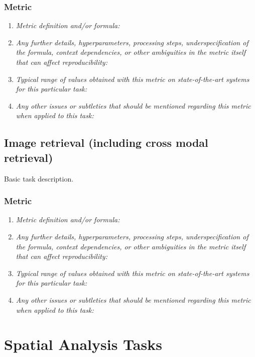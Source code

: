 \documentclass[a4paper,11pt]{article}
\begin{document}
    \subsubsection{Metric}
        \begin{enumerate}[label=\alph*.]
            \item \textit{Metric definition and/or formula:}
            \bigskip
            \item \textit{Any further details, hyperparameters, processing steps, underspecification of the formula, context dependencies, or other ambiguities in the metric itself that can affect reproducibility:}
            \bigskip
            \item \textit{Typical range of values obtained with this metric on state-of-the-art systems for this particular task:}
            \bigskip
            \item \textit{Any other issues or subtleties that should be mentioned regarding this metric when applied to this task:}
            \bigskip
        \end{enumerate}

\subsection{Image retrieval (including cross modal retrieval)}
    Basic task description.
    \subsubsection{Metric}
        \begin{enumerate}[label=\alph*.]
            \item \textit{Metric definition and/or formula:}
            \bigskip
            \item \textit{Any further details, hyperparameters, processing steps, underspecification of the formula, context dependencies, or other ambiguities in the metric itself that can affect reproducibility:}
            \bigskip
            \item \textit{Typical range of values obtained with this metric on state-of-the-art systems for this particular task:}
            \bigskip
            \item \textit{Any other issues or subtleties that should be mentioned regarding this metric when applied to this task:}
            \bigskip
        \end{enumerate}

\section{Spatial Analysis Tasks}
\end{document}
